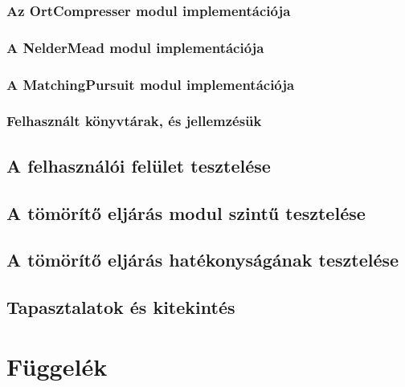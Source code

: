\documentclass[oneside,titlepage,12pt,a4paper]{report}
\begin{document}
\subsection{Az OrtCompresser modul implementációja}

\subsection{A NelderMead modul implementációja}

\subsection{A MatchingPursuit modul implementációja}

\subsection{Felhasznált könyvtárak, és jellemzésük}

\section{A felhasználói felület tesztelése}

\section{A tömörítő eljárás modul szintű tesztelése}

\section{A tömörítő eljárás hatékonyságának tesztelése}

\section{Tapasztalatok és kitekintés}

\chapter{Függelék}
\end{document}
